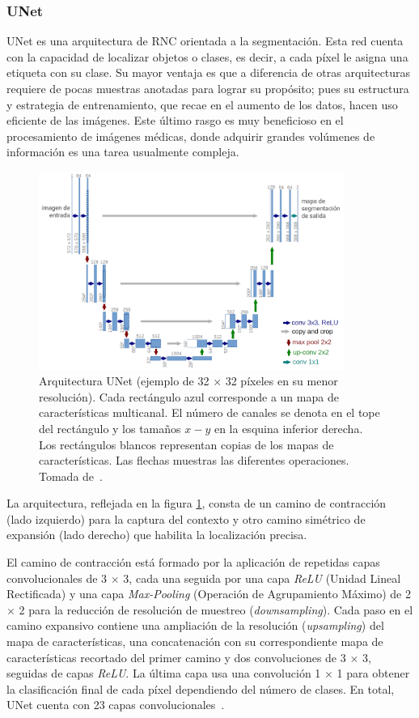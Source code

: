 \subsubsection{UNet}

UNet es una arquitectura de RNC orientada a la segmentación. Esta red cuenta con la capacidad de localizar objetos o clases, es decir, a cada píxel le asigna una etiqueta con su clase. Su mayor ventaja es que a diferencia de otras arquitecturas requiere de pocas muestras anotadas para lograr su propósito; pues su estructura y estrategia de entrenamiento, que recae en el aumento de los datos, hacen uso eficiente de las imágenes. Este último rasgo es muy beneficioso en el procesamiento de imágenes médicas, donde adquirir grandes volúmenes de información es una tarea usualmente compleja.

\begin{figure}[ht]
	\centering
	\includegraphics[width=10cm]{./Graphics/unet.png}
	\caption{Arquitectura UNet (ejemplo de 32 $\times$ 32 píxeles en su menor resolución). Cada rectángulo azul corresponde a un mapa de características multicanal. El número de canales se denota en el tope del rectángulo y los tamaños $x-y$ en la esquina inferior derecha. Los rectángulos blancos representan copias de los mapas de características. Las flechas muestras las diferentes operaciones. Tomada de~\cite{ronneberger2015u}.}
	\label{fig:unet}
\end{figure}

La arquitectura, reflejada en la figura \ref{fig:unet}, consta de un camino de contracción (lado izquierdo) para la captura del contexto y otro camino simétrico de expansión (lado derecho) que habilita la localización precisa.

El camino de contracción está formado por la aplicación de repetidas capas convolucionales de 3 $\times$ 3, cada una seguida por una capa \textit{ReLU} (Unidad Lineal Rectificada) y una capa \textit{Max-Pooling} (Operación de Agrupamiento Máximo) de 2 $\times$ 2 para la reducción de resolución de muestreo (\textit{downsampling}). Cada paso en el camino expansivo contiene una ampliación de la resolución (\textit{upsampling}) del mapa de características, una concatenación con su correspondiente mapa de características recortado del primer camino y dos convoluciones de 3 $\times$ 3, seguidas de capas \textit{ReLU}. La última capa usa una convolución 1 $\times$ 1 para obtener la clasificación final de cada píxel dependiendo del número de clases. En total, UNet cuenta con 23 capas convolucionales~\cite{ronneberger2015u}.

